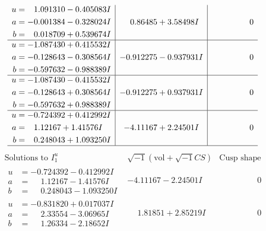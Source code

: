 \documentclass[1p]{elsarticle_modified}
\theoremstyle{definition}
\newcommand{\I}{\sqrt{-1}}
\begin{document}
$$\begin{array}{c|c|c}
\begin{aligned}
u &= \phantom{-}1.091310 - 0.405083 I \\
a &= -0.001384 - 0.328024 I \\
b &= \phantom{-}0.018709 + 0.539674 I\end{aligned}
 & \phantom{-}0.86485 + 3.58498 I & \phantom{-0.000000 } 0 \\ \hline\begin{aligned}
u &= -1.087430 + 0.415532 I \\
a &= -0.128643 - 0.308564 I \\
b &= -0.597632 - 0.988389 I\end{aligned}
 & -0.912275 - 0.937931 I & \phantom{-0.000000 } 0 \\ \hline\begin{aligned}
u &= -1.087430 - 0.415532 I \\
a &= -0.128643 + 0.308564 I \\
b &= -0.597632 + 0.988389 I\end{aligned}
 & -0.912275 + 0.937931 I & \phantom{-0.000000 } 0 \\ \hline\begin{aligned}
u &= -0.724392 + 0.412992 I \\
a &= \phantom{-}1.12167 + 1.41576 I \\
b &= \phantom{-}0.248043 + 1.093250 I\end{aligned}
 & -4.11167 + 2.24501 I & \phantom{-0.000000 } 0\\
 \hline 
 \end{array}$$\newpage$$\begin{array}{c|c|c}  
\text{Solutions to }I^u_{1}& \I (\text{vol} + \sqrt{-1}CS) & \text{Cusp shape}\\
 \hline 
\begin{aligned}
u &= -0.724392 - 0.412992 I \\
a &= \phantom{-}1.12167 - 1.41576 I \\
b &= \phantom{-}0.248043 - 1.093250 I\end{aligned}
 & -4.11167 - 2.24501 I & \phantom{-0.000000 } 0 \\ \hline\begin{aligned}
u &= -0.831820 + 0.017037 I \\
a &= \phantom{-}2.33554 - 3.06965 I \\
b &= \phantom{-}1.26334 - 2.18652 I\end{aligned}
 & \phantom{-}1.81851 + 2.85219 I & \phantom{-0.000000 } 0 \\ \hline\begin{aligned}

\end{aligned}
\end{array}$$
\end{document}
